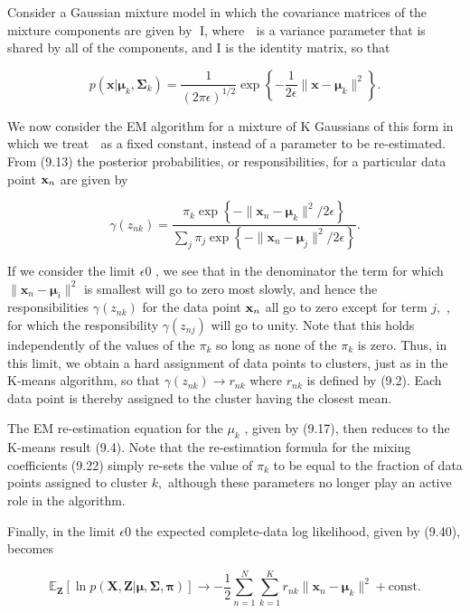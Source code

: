 \documentclass[
  10
]{article}
\newcounter{none} %
\begin{document}
Consider a Gaussian mixture model in which the covariance matrices of
the mixture components are given by I, where  is a variance parameter
that is shared by all of the components, and I is the identity matrix,
so that

\[
p (\mathbf {x} | \boldsymbol {\mu} _ {k}, \boldsymbol {\Sigma} _ {k}) = \frac {1}{(2 \pi \epsilon) ^ {1 / 2}} \exp \left\{- \frac {1}{2 \epsilon} \| \mathbf {x} - \boldsymbol {\mu} _ {k} \| ^ {2} \right\}.\tag{9.41}
\]

We now consider the EM algorithm for a mixture of K Gaussians of this
form in which we treat  as a fixed constant, instead of a parameter to
be re-estimated. From (9.13) the posterior probabilities, or
responsibilities, for a particular data point \({ \bf x } _ { n }\) are
given by

\[
\gamma (z _ {n k}) = \frac {\pi_ {k} \exp \left\{- \| \mathbf {x} _ {n} - \pmb {\mu} _ {k} \| ^ {2} / 2 \epsilon \right\}}{\sum_ {j} \pi_ {j} \exp \left\{- \| \mathbf {x} _ {n} - \pmb {\mu} _ {j} \| ^ {2} / 2 \epsilon \right\}}.\tag{9.42}
\]

If we consider the limit \(\epsilon  0\) , we see that in the
denominator the term for which
\(\| \mathbf { x } _ { n } - { \pmb { \mu } } _ { i } \| ^ { 2 }\) is
smallest will go to zero most slowly, and hence the responsibilities
\(\gamma ( z _ { n k } )\) for the data point \({ \bf x } _ { n }\) all
go to zero except for term \(j ,\) , for which the responsibility
\(\gamma ( z _ { n j } )\) will go to unity. Note that this holds
independently of the values of the \(\pi _ { k }\) so long as none of
the \(\pi _ { k }\) is zero. Thus, in this limit, we obtain a hard
assignment of data points to clusters, just as in the K-means algorithm,
so that \(\gamma ( z _ { n k } ) \to r _ { n k }\) where \(r _ { n k }\)
is defined by (9.2). Each data point is thereby assigned to the cluster
having the closest mean.

The EM re-estimation equation for the \(\mu _ { k }\) , given by (9.17),
then reduces to the K-means result (9.4). Note that the re-estimation
formula for the mixing coefficients (9.22) simply re-sets the value of
\(\pi _ { k }\) to be equal to the fraction of data points assigned to
cluster \(k ,\) although these parameters no longer play an active role
in the algorithm.

Finally, in the limit \(\epsilon  0\) the expected complete-data log
likelihood, given by (9.40), becomes

\[
\mathbb {E} _ {\mathbf {Z}} [ \ln p (\mathbf {X}, \mathbf {Z} | \boldsymbol {\mu}, \boldsymbol {\Sigma}, \boldsymbol {\pi}) ] \rightarrow - \frac {1}{2} \sum_ {n = 1} ^ {N} \sum_ {k = 1} ^ {K} r _ {n k} \| \mathbf {x} _ {n} - \boldsymbol {\mu} _ {k} \| ^ {2} + \mathrm{const.}\tag{9.43}
\]
\end{document}
